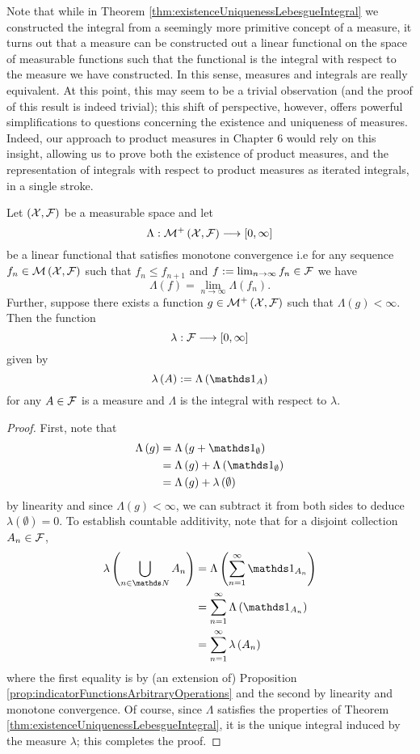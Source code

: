 Note that while in Theorem \ref{thm:existenceUniquenessLebesgueIntegral}
we constructed the integral from a seemingly more primitive concept
of a measure, it turns out that a measure can be constructed out a
linear functional on the space of measurable functions such that the
functional is the integral with respect to the measure we have constructed.
In this sense, measures and integrals are really equivalent. At this
point, this may seem to be a trivial observation (and the proof of
this result is indeed trivial); this shift of perspective, however,
offers powerful simplifications to questions concerning the existence
and uniqueness of measures. Indeed, our approach to product measures
in Chapter 6 would rely on this insight, allowing us to prove both
the existence of product measures, and the representation of integrals
with respect to product measures as iterated integrals, in a single
stroke.
\begin{thm}
\label{thm:integralMeasureEquivalence}Let $\left(\mathcal{X},\mathcal{F}\right)$ be
a measurable space and let 
\[
\Lambda:\mathcal{M}^{+}\left(\mathcal{X},\mathcal{F}\right)\longrightarrow\left[0,\infty\right]
\]
be a linear functional that satisfies monotone convergence i.e for
any sequence $f_{n}\in\mathcal{M}\left(\mathcal{X},\mathcal{F}\right)$ such that $f_{n}\leq f_{n+1}$
and $f:=\lim_{n\to\infty}f_{n}\in\mathcal{F}$ we have 
\[
\Lambda\left(f\right)=\lim_{n\to\infty}\Lambda\left(f_{n}\right).
\]
Further, suppose there exists a function $g\in\mathcal{M}^{+}\left(\mathcal{X},\mathcal{F}\right)$
such that $\Lambda\left(g\right)<\infty$. Then the function 
\[
\lambda:\mathcal{F}\longrightarrow\left[0,\infty\right]
\]
given by 
\[
\lambda\left(A\right):=\Lambda\left(\indicate_{A}\right)
\]
for any $A\in\mathcal{F}$ is a measure and $\Lambda$ is the integral with
respect to $\lambda$.
\end{thm}

\begin{proof}
First, note that 
\begin{align*}
\Lambda\left(g\right) & =\Lambda\left(g+\indicate_{\emptyset}\right)\\
 & =\Lambda\left(g\right)+\Lambda\left(\indicate_{\emptyset}\right)\\
 & =\Lambda\left(g\right)+\lambda\left(\emptyset\right)
\end{align*}
by linearity and since $\Lambda\left(g\right)<\infty$, we can subtract
it from both sides to deduce $\lambda\left(\emptyset\right)=0.$ To
establish countable additivity, note that for a disjoint collection
$A_{n}\in\mathcal{F}$, 
\begin{align*}
\lambda\left(\bigcup_{n\in\N}A_{n}\right) & =\Lambda\left(\sum_{n=1}^{\infty}\indicate_{A_{n}}\right)\\
 & =\sum_{n=1}^{\infty}\Lambda\left(\indicate_{A_{n}}\right)\\
 & =\sum_{n=1}^{\infty}\lambda\left(A_{n}\right)
\end{align*}
where the first equality is by (an extension of) Proposition \ref{prop:indicatorFunctionsArbitraryOperations}
and the second by linearity and monotone convergence. Of course, since
$\Lambda$ satisfies the properties of Theorem \ref{thm:existenceUniquenessLebesgueIntegral},
it is the unique integral induced by the measure $\lambda$; this
completes the proof.
\end{proof}

